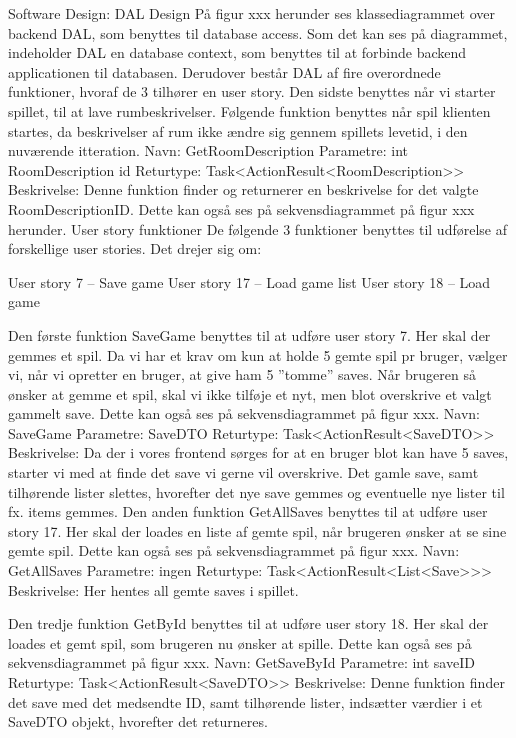 Software Design:
DAL Design 
På figur xxx herunder ses klassediagrammet over backend DAL, som benyttes til database access. Som det kan ses på diagrammet, indeholder DAL en database context, som benyttes til at forbinde backend applicationen til databasen. 
Derudover består DAL af fire overordnede funktioner, hvoraf de 3 tilhører en user story. 
Den sidste benyttes når vi starter spillet, til at lave rumbeskrivelser.
Følgende funktion benyttes når spil klienten startes, da beskrivelser af rum ikke ændre sig gennem spillets levetid, i den nuværende itteration.
Navn: GetRoomDescription
Parametre: int RoomDescription id
Returtype: Task<ActionResult<RoomDescription>>
Beskrivelse: Denne funktion finder og returnerer en beskrivelse for det valgte RoomDescriptionID. Dette kan også ses på sekvensdiagrammet på figur xxx herunder.
User story funktioner
De følgende 3 funktioner benyttes til udførelse af forskellige user stories.
Det drejer sig om:

User story 7 – Save game
User story 17 – Load game list
User story 18 – Load game

Den første funktion SaveGame benyttes til at udføre user story 7.
Her skal der gemmes et spil. Da vi har et krav om kun at holde 5 gemte spil pr bruger, vælger vi, når vi opretter en bruger, at give ham 5 ”tomme” saves. Når brugeren så ønsker at gemme et spil, skal vi ikke tilføje et nyt, men blot overskrive et valgt gammelt save.
Dette kan også ses på sekvensdiagrammet på figur xxx.
Navn: SaveGame
Parametre: SaveDTO
Returtype: Task<ActionResult<SaveDTO>>
Beskrivelse: Da der i vores frontend sørges for at en bruger blot kan have 5 saves, starter vi med at finde det save vi gerne vil overskrive. Det gamle save, samt tilhørende lister slettes, hvorefter det nye save gemmes og eventuelle nye lister til fx. items gemmes.
Den anden funktion GetAllSaves benyttes til at udføre user story 17.
Her skal der loades en liste af gemte spil, når brugeren ønsker at se sine gemte spil. Dette kan også ses på sekvensdiagrammet på figur xxx.
Navn: GetAllSaves
Parametre: ingen
Returtype: Task<ActionResult<List<Save>>> 
Beskrivelse: Her hentes all gemte saves i spillet.

Den tredje funktion GetById benyttes til at udføre user story 18.
Her skal der loades et gemt spil, som brugeren nu ønsker at spille. 
Dette kan også ses på sekvensdiagrammet på figur xxx.
Navn: GetSaveById 
Parametre: int saveID
Returtype: Task<ActionResult<SaveDTO>>
Beskrivelse: Denne funktion finder det save med det medsendte ID, samt tilhørende lister, indsætter værdier i et SaveDTO objekt, hvorefter det returneres.